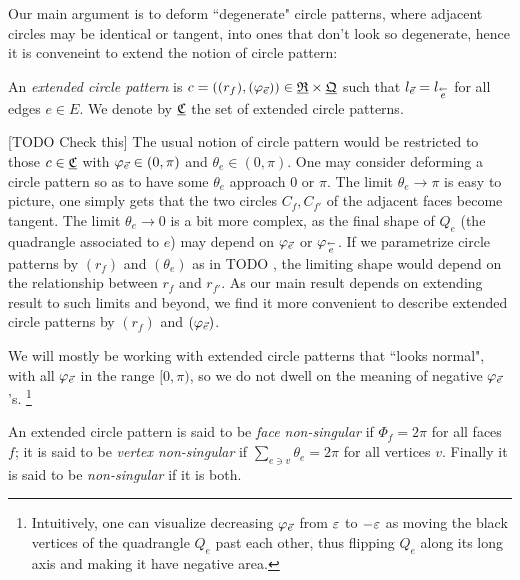Our main argument is to deform ``degenerate" circle patterns,
where adjacent circles may
be identical or tangent, into ones that don't look so degenerate,
hence it is conveneint to extend the notion of circle pattern:

\begin{definition}
An \emph{extended circle pattern} is
$c = ((r_f), (\varphi_{\vec{e}})) \in {\underline{\mathfrak{R}}} \times {\underline{\mathfrak{Q}}}$
such that $l_{\vec{e}} = l_{\overset{\leftarrow}{e}}$ for all edges $e\in E$. We denote by
${\underline{\mathfrak{C}}}$ the set of extended circle patterns.
\end{definition}




[TODO Check this] The usual notion of circle pattern would be restricted to those $c\in {\underline{\mathfrak{C}}}$
with $\varphi_{\vec{e}} \in (0,\pi)$ and $\theta_e \in (0,\pi)$.
One may consider deforming a circle pattern so as to have some $\theta_e$ approach 0 or $\pi$.
The limit $\theta_e \to \pi$ is easy to picture, one simply gets that the two circles
$C_f, C_{f'}$ of the adjacent faces become tangent. The limit $\theta_e \to 0$
is a bit more complex, as the final shape of $Q_e$ (the quadrangle associated to $e$)
may depend on $\varphi_{\vec{e}}$ or $\varphi_{\overset{\leftarrow}{e}}$.
If we parametrize circle patterns by $(r_f)$ and $(\theta_e)$ as in TODO ,
the limiting shape would depend on the relationship between 
$r_f$ and $r_{f'}$.
As our main result depends on extending  result
to such limits and beyond,
we find it more convenient to describe extended circle patterns by
$(r_f)$ and $(\varphi_{\vec{e}})$.


We will mostly be working with extended circle patterns that ``looks normal",
with all $\varphi_{\vec{e}}$ in the range $[0,\pi)$,
so we do not dwell on the meaning of negative $\varphi_{\vec{e}}$'s.
\footnote{
Intuitively, one can visualize decreasing $\varphi_{\vec{e}}$
from $\varepsilon$ to $-\varepsilon$
as moving the black vertices of the quadrangle $Q_e$ past each other,
thus flipping $Q_e$ along its long axis
and making it have negative area.
}

\begin{definition}
An extended circle pattern is said to be \emph{face non-singular}
if $\Phi_f = 2\pi$ for all faces $f$; it is said to be \emph{vertex non-singular}
if $\sum_{e \ni v} \theta_e = 2\pi$ for all vertices $v$.
Finally it is said to be \emph{non-singular} if it is both.
\end{definition}

